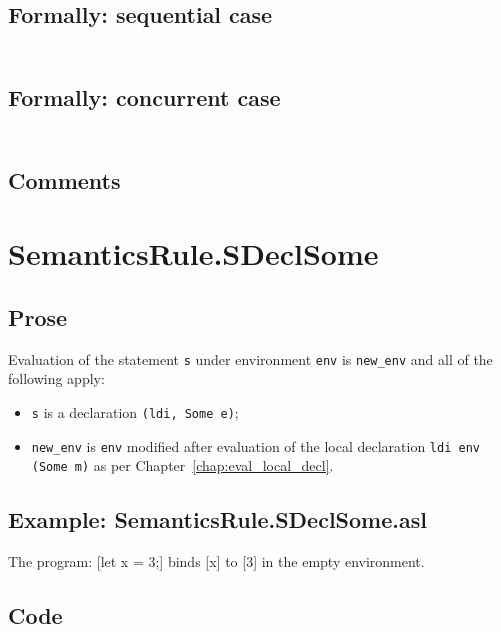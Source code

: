 \documentclass{book}
\begin{document}
  \subsection{Formally: sequential case}
  \begin{align}
  \end{align} 

  \subsection{Formally: concurrent case}
  \begin{align}
  \end{align} 

    \subsection{Comments}

\section{SemanticsRule.SDeclSome \label{sec:SemanticsRule.SDeclSome}}

    \subsection{Prose}
  Evaluation of the statement \texttt{s} under environment \texttt{env} is
\texttt{new\_env} and all of the following apply:
    \begin{itemize}
    \item \texttt{s} is a declaration \texttt{(ldi, Some e)};
    \item \texttt{new\_env} is \texttt{env} modified after evaluation of the local declaration
      \texttt{ldi env (Some m)} as per Chapter~\ref{chap:eval_local_decl}.
    \end{itemize}

    \subsection{Example: SemanticsRule.SDeclSome.asl}
    The program:
    [let x = 3;] binds [x] to [3] in the empty environment.

  \subsection{Code}
\end{document}
